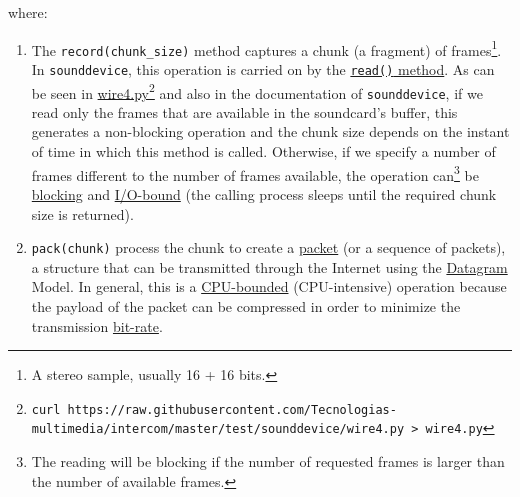 
where:

\begin{enumerate}
\item The \verb|record(chunk_size)| method captures a chunk (a
  fragment) of frames\footnote{A stereo sample, usually 16 + 16
    bits.}. In \verb|sounddevice|, this operation is carried on by the
  \href{https://python-sounddevice.readthedocs.io/en/0.4.0/api/streams.html#sounddevice.Stream.read}{\texttt{read()}
    method}. As can be seen in
  \href{https://raw.githubusercontent.com/Tecnologias-multimedia/intercom/master/test/sounddevice/wire4.py}{wire4.py}\footnote{
    \texttt{curl
      https://raw.githubusercontent.com/Tecnologias-multimedia/intercom/master/test/sounddevice/wire4.py
      > wire4.py}} and also in the documentation of
  \verb|sounddevice|, if we read only the frames that are available in
  the soundcard's buffer, this generates a non-blocking operation and
  the chunk size depends on the instant of time in which this method
  is called. Otherwise, if we specify a number of frames different to
  the number of frames available, the operation can\footnote{The
    reading will be blocking if the number of requested frames is
    larger than the number of available frames.} be
  \href{https://python-sounddevice.readthedocs.io/en/0.4.0/api/streams.html#sounddevice.Stream.write}{blocking}
  and \href{https://en.wikipedia.org/wiki/I/O_bound}{I/O-bound} (the
  calling process sleeps until the required chunk size is returned).

\item \verb|pack(chunk)| process the chunk to create a
  \href{https://en.wikipedia.org/wiki/Network_packet}{packet} (or a
  sequence of packets), a structure that can be transmitted through
  the Internet using the
  \href{https://en.wikipedia.org/wiki/Datagram}{Datagram} Model. In
  general, this is a
  \href{https://en.wikipedia.org/wiki/CPU-bound}{CPU-bounded}
  (CPU-intensive) operation because the payload of the packet can be
  compressed in order to minimize the transmission
  \href{https://en.wikipedia.org/wiki/Bit_rate}{bit-rate}.


\end{enumerate}
